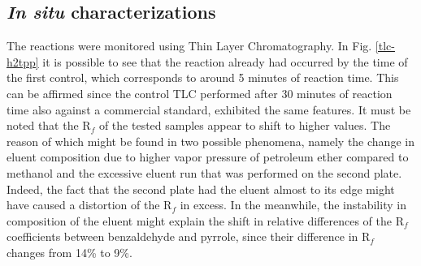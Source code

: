 \documentclass[num-refs]{wiley-article}
\begin{document}
\subsection{\textit{In situ} characterizations}
The reactions were monitored using Thin Layer Chromatography.
In Fig. \ref{tlc-h2tpp} it is possible to see that the reaction already had occurred by the time of the first control, which corresponds to around 5 minutes of reaction time.
This can be affirmed since the control TLC performed after 30 minutes of reaction time also against a commercial standard, exhibited the same features.
It must be noted that the R$_{f}$ of the tested samples appear to shift to higher values.
The reason of which might be found in two possible phenomena, namely the change in eluent composition due to higher vapor pressure of petroleum ether compared to methanol and the excessive eluent run that was performed on the second plate.
Indeed, the fact that the second plate had the eluent almost to its edge might have caused a distortion of the R$_{f}$ in excess.
In the meanwhile, the instability in composition of the eluent might explain the shift in relative differences of the R$_{f}$ coefficients between benzaldehyde and pyrrole, since their difference in R$_{f}$ changes from 14\% to 9\%.
\end{document}
